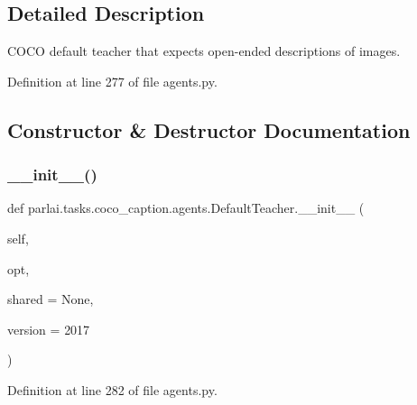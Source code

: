 \subsection{Detailed Description}
\begin{DoxyVerb}COCO default teacher that expects open-ended descriptions of images.
\end{DoxyVerb}
 

Definition at line 277 of file agents.\+py.



\subsection{Constructor \& Destructor Documentation}
\mbox{\label{classparlai_1_1tasks_1_1coco__caption_1_1agents_1_1DefaultTeacher_a3260b2d2bdda6b791125190b24236ae9}} 
\subsubsection{\texorpdfstring{\+\_\+\+\_\+init\+\_\+\+\_\+()}{\_\_init\_\_()}}
{\footnotesize\ttfamily def parlai.\+tasks.\+coco\+\_\+caption.\+agents.\+Default\+Teacher.\+\_\+\+\_\+init\+\_\+\+\_\+ (\begin{DoxyParamCaption}\item[{}]{self,  }\item[{}]{opt,  }\item[{}]{shared = {\ttfamily None},  }\item[{}]{version = {\ttfamily \textquotesingle{}2017\textquotesingle{}} }\end{DoxyParamCaption})}



Definition at line 282 of file agents.\+py.


